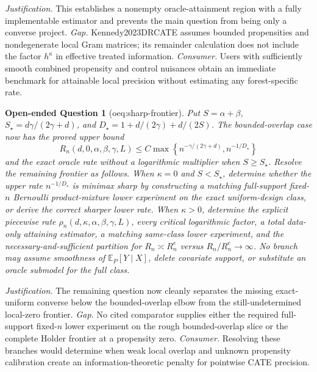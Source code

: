 \documentclass{article}
\newtheorem{openendedquestion}{Open-ended Question}
\begin{document}
\par\smallskip\noindent \textit{Justification.} This establishes a nonempty oracle-attainment region with a fully implementable estimator and prevents the main question from being only a converse project. \textit{Gap.} Kennedy2023DRCATE assumes bounded propensities and nondegenerate local Gram matrices; its remainder calculation does not include the factor \(h^{\kappa}\) in effective treated information. \textit{Consumer.} Users with sufficiently smooth combined propensity and control nuisances obtain an immediate benchmark for attainable local precision without estimating any forest-specific rate.

\begin{openendedquestion}[oeq:sharp-frontier]\label{oeq:sharp-frontier}
Put \(S=\alpha+\beta\), \(S_\star=d\gamma/(2\gamma+d)\), and \(D_\star=1+d/(2\gamma)+d/(2S)\).  The bounded-overlap case now has the proved upper bound
\[
 R_n(d,0,\alpha,\beta,\gamma,L)
 \leq C\max\left\{n^{-\gamma/(2\gamma+d)},n^{-1/D_\star}\right\}
\]
and the exact oracle rate without a logarithmic multiplier when \(S\geq S_\star\).  Resolve the remaining frontier as follows.  When \(\kappa=0\) and \(S<S_\star\), determine whether the upper rate \(n^{-1/D_\star}\) is minimax sharp by constructing a matching full-support fixed-\(n\) Bernoulli product-mixture lower experiment on the exact uniform-design class, or derive the correct sharper lower rate.  When \(\kappa>0\), determine the explicit piecewise rate \(\rho_n(d,\kappa,\alpha,\beta,\gamma,L)\), every critical logarithmic factor, a total data-only attaining estimator, a matching same-class lower experiment, and the necessary-and-sufficient partition for \(R_n\asymp R_n^e\) versus \(R_n/R_n^e\to\infty\).  No branch may assume smoothness of \(\mathbb E_P[Y\mid X]\), delete covariate support, or substitute an oracle submodel for the full class.
\end{openendedquestion}
\par\smallskip\noindent \textit{Justification.} The remaining question now cleanly separates the missing exact-uniform converse below the bounded-overlap elbow from the still-undetermined local-zero frontier. \textit{Gap.} No cited comparator supplies either the required full-support fixed-\(n\) lower experiment on the rough bounded-overlap slice or the complete Holder frontier at a propensity zero. \textit{Consumer.} Resolving these branches would determine when weak local overlap and unknown propensity calibration create an information-theoretic penalty for pointwise CATE precision.
\end{document}
